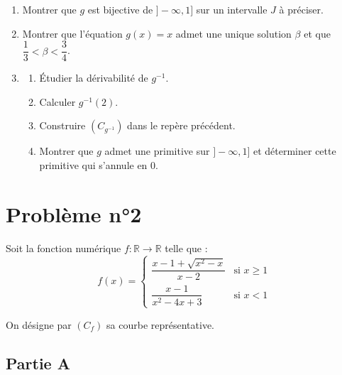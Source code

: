 \documentclass[12pt,a4paper]{article}
\begin{document}
\begin{enumerate}
    \item Montrer que \( g \) est bijective de \( ] -\infty, 1] \) sur un intervalle \( J \) à préciser.
    \item Montrer que l’équation \( g(x) = x \) admet une unique solution \( \beta \) et que \( \dfrac{1}{3} < \beta < \dfrac{3}{4} \).
    \item 
    \begin{enumerate}
        \item Étudier la dérivabilité de \( g^{-1} \).
        \item Calculer \( g^{-1}(2) \).
        \item Construire \( (C_{g^{-1}}) \) dans le repère précédent.
        \item Montrer que \( g \) admet une primitive sur \( ] -\infty, 1] \) et déterminer cette primitive qui s’annule en 0.
    \end{enumerate}
\end{enumerate}
\section*{Problème n°2}

Soit la fonction numérique \( f : \mathbb{R} \to \mathbb{R} \) telle que :
\[
f(x) = 
\begin{cases} 
\dfrac{x - 1 + \sqrt{x^2 - x}}{x - 2} & \text{si } x \geq 1 \\
\dfrac{x - 1}{x^2 - 4x + 3} & \text{si } x < 1 
\end{cases}
\]

On désigne par \( (C_f) \) sa courbe représentative.

\subsection*{Partie A}
\end{document}

